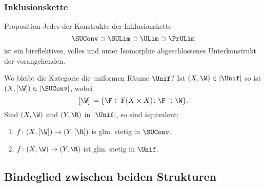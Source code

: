 \begin{frame}
  \frametitle{Inklusionskette}
  \begin{block}{Proposition}
  Jedes der Konstrukte der Inklusionskette
  $$
  \SUConv \supset \SULim \supset \ULim \supset \PrULim
  $$
  ist ein bireflektives, volles und unter Isomorphie abgeschlossenes Unterkonstrukt der vorangehenden.
  \end{block}
  \pause
  \begin{block}{Wo bleibt die Kategorie die uniformen Räume $\Unif$?}
    Ist $(X,\W) \in |\Unif|$ so ist $(X,[\W]) \in |\SUConv|$, wobei
    $$
    [\W] \coloneqq \{\F \in \mathrm{F}(X \times X) \colon \F \supset \W \}.
    $$
    Sind $(X,\W)$ und $(Y,\R)$ in $|\Unif|$, so sind äquivalent:
    \begin{enumerate}[(1)]
      \item $f \colon (X, [\W]) \to (Y, [\R])$ is glm. stetig in $\SUConv$.
      \item $f \colon (X,\W) \to (Y,\R)$ ist glm. stetig in $\Unif$.
    \end{enumerate}
  \end{block}
\end{frame}

\subsection{Bindeglied zwischen beiden Strukturen}

